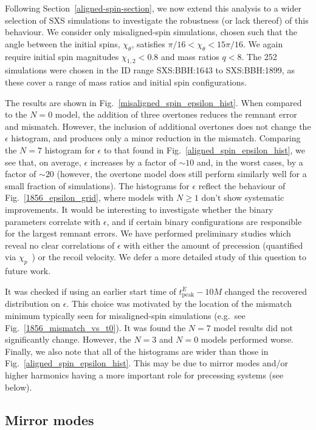 Following Section~\ref{aligned-spin-section}, we now extend this analysis to a wider selection of SXS simulations to investigate the robustness (or lack thereof) of this behaviour. We consider only misaligned-spin simulations, chosen such that the angle between the initial spins, $\chi_{\theta}$, satisfies $\pi/16 < \chi_{\theta} < 15\pi/16$. We again require initial spin magnitudes $\chi_{1,2} < 0.8$ and mass ratios $q<8$. The 252 simulations were chosen in the ID range SXS:BBH:1643 to SXS:BBH:1899, as these cover a range of mass ratios and initial spin configurations.

The results are shown in Fig.~\ref{misaligned_spin_epsilon_hist}. 
When compared to the $N=0$ model, the addition of three overtones reduces the remnant error and mismatch. 
However, the inclusion of additional overtones does not change the $\epsilon$ histogram, and produces only a minor reduction in the mismatch.
Comparing the $N=7$ histogram for $\epsilon$ to that found in Fig.~\ref{aligned_spin_epsilon_hist}, we see that, on average, $\epsilon$ increases by a factor of $\sim 10$ and, in the worst cases, by a factor of $\sim 20$ (however, the overtone model does still perform similarly well for a small fraction of simulations). 
The histograms for $\epsilon$ reflect the behaviour of Fig.~\ref{1856_epsilon_grid}, where models with $N \geq 1$ don't show systematic improvements. 
It would be interesting to investigate whether the binary parameters correlate with $\epsilon$, and if certain binary configurations are responsible for the largest remnant errors. We have performed preliminary studies which reveal no clear correlations of $\epsilon$ with either the amount of precession (quantified via $\chi_p$~\cite{Schmidt:2014iyl}) or the recoil velocity. We defer a more detailed study of this question to future work.

It was checked if using an earlier start time of $t_{\mathrm{peak}}^{\dot{E}} - 10M$ changed the recovered distribution on $\epsilon$. 
This choice was motivated by the location of the mismatch minimum typically seen for misaligned-spin simulations (e.g.\ see Fig.~\ref{1856_mismatch_vs_t0}). 
It was found the $N=7$ model results did not significantly change. 
However, the $N=3$ and $N=0$ models performed worse.
Finally, we also note that all of the histograms are wider than those in Fig.~\ref{aligned_spin_epsilon_hist}. 
This may be due to mirror modes and/or higher harmonics having a more important role for precessing systems (see below). 


\subsection{Mirror modes} \label{subsec:misaligned_mirror_modes}


